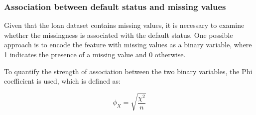 \subsubsection{Association between default status and missing values}
\label{subsubsec:target-na-ass}

Given that the loan dataset contains missing values, it is necessary to examine whether the missingness is associated with the default status. One possible approach is to encode the feature with missing values as a binary variable, where 1 indicates the presence of a missing value and 0 otherwise.

To quantify the strength of association between the two binary variables, the Phi coefficient is used, which is defined as:

\begin{equation}\label{eq}
    \phi_{X} = \sqrt{\frac{\chi^{2}}{n}}
    \end{equation}

